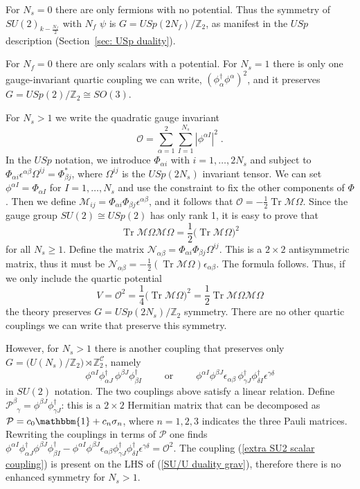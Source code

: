 \documentclass[a4paper, 12pt]{article}
\newcommand{\ud}[2]{^{#1}_{\phantom{#1}#2}}
\numberwithin{equation}{section}
\newcommand{\be}{\begin{equation}} \newcommand{\ee}{\end{equation}}
\newcommand{\cC}{\mathcal{C}}
\newcommand{\cM}{\mathcal{M}}
\newcommand{\cN}{\mathcal{N}}
\newcommand{\cO}{\mathcal{O}}
\newcommand{\cP}{\mathcal{P}}
\newcommand{\bZ}{\mathbb{Z}}
\newcommand{\unit}{\mathbbm{1}}
\DeclareMathOperator{\Tr}{Tr}
\begin{document}
For $N_s=0$ there are only fermions with no potential. Thus the symmetry of $SU(2)_{k - \frac{N_f}2}$ with $N_f$ $\psi$ is $G = USp(2N_f)/\bZ_2$, as manifest in the $USp$ description (Section~\ref{sec: USp duality}).

For $N_f=0$ there are only scalars with a potential. For $N_s=1$ there is only one gauge-invariant quartic coupling we can write, $(\phi_\alpha^\dag \phi^\alpha)^2$, and it preserves $G = USp(2)/\bZ_2 \cong SO(3)$.

For $N_s>1$ we write the quadratic gauge invariant
\be
\cO = \sum_{\alpha=1}^2 \sum_{I=1}^{N_s} |\phi^{\alpha I}|^2 \;.
\ee
In the $USp$ notation, we introduce $\Phi_{\alpha i}$ with $i=1,\dots, 2N_s$ and subject to $\Phi_{\alpha i} \epsilon^{\alpha\beta} \Omega^{ij} = \Phi^*_{\beta j}$, where $\Omega^{ij}$ is the $USp(2N_s)$ invariant tensor. We can set $\phi^{\alpha I} = \Phi_{\alpha I}$ for $I=1,\dots, N_s$ and use the constraint to fix the other components of $\Phi$. Then we define $\cM_{ij} = \Phi_{\alpha i} \Phi_{\beta j} \epsilon^{\alpha\beta}$, and it follows that $\cO = - \frac12 \Tr \cM\Omega$. Since the gauge group $SU(2) \cong USp(2)$ has only rank 1, it is easy to prove that
\be
\Tr \cM \Omega \cM \Omega = \frac12 \big( \Tr \cM \Omega \big)^2
\ee
for all $N_s \geq 1$. Define the matrix $\cN_{\alpha\beta} = \Phi_{\alpha i} \Phi_{\beta j} \Omega^{ij}$. This is a $2\times 2$ antisymmetric matrix, thus it must be $\cN_{\alpha\beta} = - \frac12 (\Tr \cM\Omega) \epsilon_{\alpha\beta}$. The formula follows. Thus, if we only include the quartic potential
\be
V = \cO^2 = \frac14 \big( \Tr \cM \Omega \big)^2 = \frac12 \Tr \cM\Omega \cM \Omega
\ee
the theory preserves $G = USp(2N_s)/\bZ_2$ symmetry. There are no other quartic couplings we can write that preserve this symmetry.

However, for $N_s>1$ there is another coupling that preserves only \mbox{$G = \big( U(N_s) / \bZ_2\big) \rtimes \bZ_2^\cC$}, namely
\be
\label{extra SU2 scalar coupling}
\phi^{\alpha I} \phi^\dag_{\alpha J} \, \phi^{\beta J} \phi^\dag_{\beta I} \qquad\text{ or }\qquad \phi^{\alpha I} \phi^{\beta J} \epsilon_{\alpha\beta} \, \phi^\dag_{\gamma J} \phi^\dag_{\delta I} \epsilon^{\gamma\delta}
\ee
in $SU(2)$ notation. The two couplings above satisfy a linear relation. Define $\cP\ud{\beta}{\gamma} = \phi^{\beta J} \phi^\dag_{\gamma J}$: this is a $2\times 2$ Hermitian matrix that can be decomposed as $\cP = c_0 \unit + c_n \sigma_n$, where \mbox{$n=1,2,3$} indicates the three Pauli matrices. Rewriting the couplings in terms of $\cP$ one finds $\phi^{\alpha I} \phi^\dag_{\alpha J} \phi^{\beta J} \phi^\dag_{\beta I} - \phi^{\alpha I} \phi^{\beta J} \epsilon_{\alpha\beta} \phi^\dag_{\gamma J} \phi^\dag_{\delta I} \epsilon^{\gamma\delta} = \cO^2$. The coupling (\ref{extra SU2 scalar coupling}) is present on the LHS of (\ref{SU/U duality grav}), therefore there is no enhanced symmetry for $N_s>1$.
\end{document}

